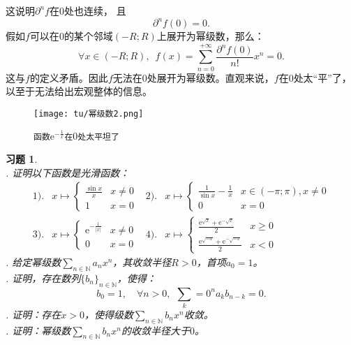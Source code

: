 \documentclass[12pt,UTF8]{ctexbook}
\theoremstyle{definition}
\theoremstyle{plain}
\newtheorem{sk}{思考}[section]
\newtheorem{xt}{习题}[section]
\begin{document}
\begin{appendix}
这说明$\partial^n f$在$0$处也连续，
且
$$ \partial^n f(0) = 0.$$
假如$f$可以在$0$的某个邻域$(-R;R)$上展开为幂级数，那么：
$$ \forall x \in (-R;R) ,\,\,\, f(x) = \sum_{n=0}^{+\infty} \frac{\partial^n f(0)}{n!} x^n = 0. $$
这与$f$的定义矛盾。因此$f$无法在$0$处展开为幂级数。直观来说，$f$在$0$处太“平”了，以至于无法给出宏观整体的信息。

\begin{figure}[h] %
    \centering
    \texttt{[image: tu/幂级数2.png]}
    \caption*{\texttt{函数}$\displaystyle \mathrm{e}^{-\frac{1}{x}}$\texttt{在}$0$\texttt{处太平坦了}}
\end{figure}


\begin{xt}
    \mbox{} \\
    . 证明以下函数是光滑函数：
    \begin{align*}
        1).& 
        x \mapsto \begin{cases}
            \frac{\sin{x}}{x} & x\neq 0 \\
            1 & x = 0 
        \end{cases}
        &2).&
        x \mapsto \begin{cases}
            \frac{1}{\sin{x}} - \frac{1}{x} & x\in (-\pi;\pi), x\neq 0 \\
            0 & x = 0 
        \end{cases} \\
        3).& 
        x \mapsto \begin{cases}
            \mathrm{e}^{-\frac{1}{|x|}} & x\neq 0 \\
            0 & x = 0 
        \end{cases}
        &4).&
        x \mapsto \begin{cases}
            \frac{\mathrm{e}^{\sqrt{x}} + \mathrm{e}^{-\sqrt{x}}}{2} & x\geqslant 0 \\
            \frac{\mathrm{e}^{\sqrt{-x}} + \mathrm{e}^{-\sqrt{-x}}}{2} & x < 0 
        \end{cases}
    \end{align*}
    . 给定幂级数$\sum_{n\in\mathbb{N}} a_n x^n$，其收敛半径$R>0$，首项$a_0=1$。\\
    . 证明，存在数列$\{b_n\}_{n\in\mathbb{N}}$，使得：
    $$
    b_0 = 1, \quad \forall n > 0, \;\, \sum_k=0^n a_k b_{n-k} = 0.
    $$
    . 证明：存在$x>0$，使得级数$\sum_{n\in\mathbb{N}} b_n x^n$收敛。\\
    . 证明：幂级数$\sum_{n\in\mathbb{N}} b_n x^n$的收敛半径大于$0$。
\end{xt}



\end{appendix}
\end{document}
